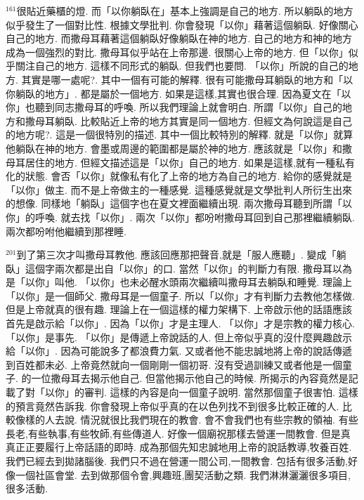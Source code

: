 \documentclass{book}
\begin{document}
$^{161}$很貼近藥櫃的燈.
而「以你躺臥在」基本上強調是自己的地方.
所以躺臥的地方似乎發生了一個對比性.
根據文學批判.
你會發現「以你」藉著這個躺臥.
好像關心自己的地方.
而撒母耳藉著這個躺臥好像躺臥在神的地方.
自己的地方和神的地方成為一個強烈的對比.
撒母耳似乎站在上帝那邊.
很關心上帝的地方.
但「以你」似乎關注自己的地方.
這樣不同形式的躺臥.
但我們也要問.
「以你」所說的自己的地方.
其實是哪一處呢?.
其中一個有可能的解釋.
很有可能撒母耳躺臥的地方和「以你躺臥的地方」.
都是屬於一個地方.
如果是這樣,其實也很合理.
因為夏文在「以你」也聽到同志撒母耳的呼喚.
所以我們理論上就會明白.
所謂「以你」自己的地方和撒母耳躺臥.
比較貼近上帝的地方其實是同一個地方.
但經文為何說這是自己的地方呢?.
這是一個很特別的描述.
其中一個比較特別的解釋.
就是「以你」就算他躺臥在神的地方.
會墨或周邊的範圍都是屬於神的地方.
應該就是「以你」和撒母耳居住的地方.
但經文描述這是「以你」自己的地方.
如果是這樣,就有一種私有化的狀態.
會否「以你」就像私有化了上帝的地方為自己的地方.
給你的感覺就是「以你」做主.
而不是上帝做主的一種感覺.
這種感覺就是文學批判人所衍生出來的想像.
同樣地「躺臥」這個字也在夏文裡面繼續出現.
兩次撒母耳聽到所謂「以你」的呼喚.
就去找「以你」.
兩次「以你」都吩咐撒母耳回到自己那裡繼續躺臥.
兩次都吩咐他繼續到那裡睡.

$^{201}$到了第三次才叫撒母耳教他.
應該回應那把聲音,就是「服人應聽」.
變成「躺臥」這個字兩次都是出自「以你」的口.
當然「以你」的判斷力有限.
撒母耳以為是「以你」叫他.
「以你」也未必醒水頭兩次繼續叫撒母耳去躺臥和睡覺.
理論上「以你」是一個師父.
撒母耳是一個童子.
所以「以你」才有判斷力去教他怎樣做.
但是上帝就真的很有趣.
理論上在一個這樣的權力架構下.
上帝啟示他的話語應該首先是啟示給「以你」.
因為「以你」才是主理人.
「以你」才是宗教的權力核心.
「以你」是事先.
「以你」是傳遞上帝說話的人.
但上帝似乎真的沒什麼興趣啟示給「以你」.
因為可能說多了都浪費力氣.
又或者他不能忠誠地將上帝的說話傳遞到百姓都未必.
上帝竟然就向一個剛剛一個初哥.
沒有受過訓練又或者他是一個童子.
的一位撒母耳去揭示他自己.
但當他揭示他自己的時候.
所揭示的內容竟然是記載了對「以你」的審判.
這樣的內容是向一個童子說明.
當然那個童子很害怕.
這樣的預言竟然告訴我.
你會發現上帝似乎真的在以色列找不到很多比較正確的人.
比較像樣的人去說.
情況就很比我們現在的教會.
會不會我們也有些宗教的領袖.
有些長老,有些執事,有些牧師,有些傳道人.
好像一個廟祝那樣去營運一間教會.
但是真真正正要履行上帝話語的即時.
成為那個先知忠誠地用上帝的說話教導,牧養百姓.
我們已經去到拋諸腦後.
我們只不過在營運一間公司,一間教會.
包括有很多活動,好像一個社區會堂.
去到做那個令會,興趣班,團契活動之類.
我們淋淋灑灑很多項目,很多活動.
\end{document}
